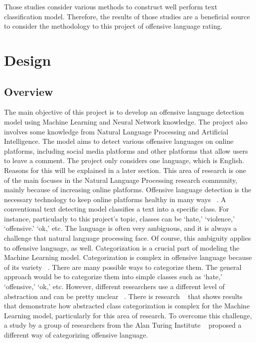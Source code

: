 \documentclass[11pt, natbib=false]{article}
\begin{document}
\begin{multicols}{2}
Those studies consider various methods to construct well perform text classification model.
Therefore, the results of those studies are a beneficial source to consider the methodology to this project of offensive language rating. 



\section{Design}
\subsection{Overview}
The main objective of this project is to develop an offensive language detection model using Machine Learning and Neural Network knowledge.
The project also involves some knowledge from Natural Language Processing and Artificial Intelligence. The model aims to detect various offensive languages on online platforms, including social media platforms and other platforms that allow users to leave a comment.
The project only considers one language, which is English.
Reasons for this will be explained in a later section.
This area of research is one of the main focuses in the Natural Language Processing research community, mainly because of increasing online platforms.
Offensive language detection is the necessary technology to keep online platforms healthy in many ways ~\cite{vidgen2019challenges}. A conventional text detecting model classifies a text into a specific class.
For instance, particularly to this project’s topic, classes can be ‘hate,’ ‘violence,’ ‘offensive.’ ‘ok,’ etc. The language is often very ambiguous, and it is always a challenge that natural language processing face.
Of course, this ambiguity applies to offensive language, as well. Categorization is a crucial part of modeling the Machine Learning model.
Categorization is complex in offensive language because of its variety ~\cite{vidgen2019challenges}.
There are many possible ways to categorize them. The general approach would be to categorize them into simple classes such as ‘hate,’ ‘offensive,’ ‘ok,’ etc. However, different researchers use a different level of abstraction and can be pretty unclear ~\cite{vidgen2019challenges}.
There is research ~\cite{malmasi2017detecting} that shows results that demonstrate how abstracted class categorization is complex for the Machine Learning model, particularly for this area of research.
To overcome this challenge, a study by a group of researchers from the Alan Turing Institute ~\cite{vidgen2019challenges} proposed a different way of categorizing offensive language.

\end{multicols}
\end{document}

